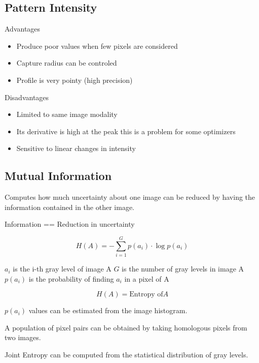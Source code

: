\subsection{Pattern Intensity}

Advantages

\begin{itemize}
\item Produce poor values when few pixels are considered
\item Capture radius can be controled
\item Profile is very pointy (high precision)
\end{itemize}

Disadvantages
\begin{itemize}
\item Limited to same image modality
\item Its derivative is high at the peak this is a problem for some optimizers
\item Sensitive to linear changes in intensity
\end{itemize}


\subsection{Mutual Information}


Computes how much uncertainty about one image can be
reduced by having the information contained in the other
image.

Information == Reduction in uncertainty

\begin{equation}
H(A)=-\sum _{i=1}^{G}p(a_{i})\cdot \log p(a_{i})
\end{equation}

\begin{center}
$a_{i}$ is the i-th gray level of image A
$G$ is the number of gray levels in image A
$p(a_{i})$ is the probability of finding $a_{i}$ in a pixel of A
\end{center}

\begin{equation}
H(A) = \mbox{Entropy of} A
\end{equation}

$p(a_{i})$ values can be estimated from the image histogram.

A population of pixel pairs can be obtained by taking homologous pixels from
two images.

Joint Entropy can be computed from the statistical distribution of gray levels.

